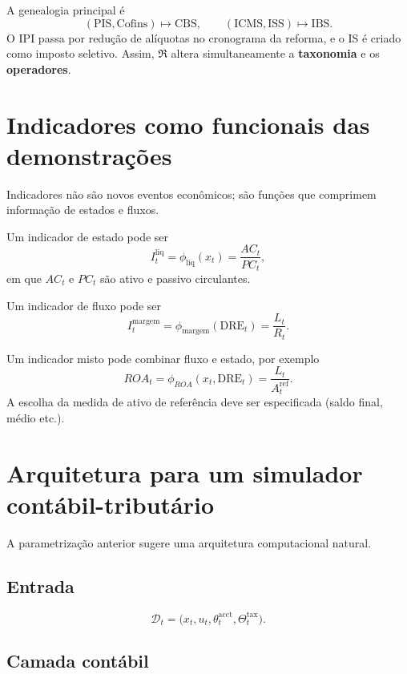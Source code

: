 \documentclass[11pt,a4paper]{article}
\newcommand{\DRE}{\mathrm{DRE}}
\newcommand{\CBS}{\mathrm{CBS}}
\newcommand{\IBS}{\mathrm{IBS}}
\newcommand{\ICMS}{\mathrm{ICMS}}
\newcommand{\ISS}{\mathrm{ISS}}
\newcommand{\PIS}{\mathrm{PIS}}
\newcommand{\COFINS}{\mathrm{Cofins}}
\begin{document}
A genealogia principal é
\[
(\PIS,\COFINS)\mapsto\CBS,
\qquad
(\ICMS,\ISS)\mapsto\IBS.
\]
O IPI passa por redução de alíquotas no cronograma da reforma, e o IS é criado como imposto seletivo. Assim, $\mathfrak R$ altera simultaneamente a \textbf{taxonomia} e os \textbf{operadores}.

\section{Indicadores como funcionais das demonstrações}

Indicadores não são novos eventos econômicos; são funções que comprimem informação de estados e fluxos.

Um indicador de estado pode ser
\[
I_t^{\mathrm{liq}}=\phi_{\mathrm{liq}}(x_t)
=\frac{AC_t}{PC_t},
\]
em que $AC_t$ e $PC_t$ são ativo e passivo circulantes.

Um indicador de fluxo pode ser
\[
I_t^{\mathrm{margem}}
=\phi_{\mathrm{margem}}(\DRE_t)
=\frac{L_t}{R_t}.
\]

Um indicador misto pode combinar fluxo e estado, por exemplo
\[
ROA_t=\phi_{ROA}(x_t,\DRE_t)
=\frac{L_t}{A_t^{\mathrm{ref}}}.
\]
A escolha da medida de ativo de referência deve ser especificada (saldo final, médio etc.).

\section{Arquitetura para um simulador contábil-tributário}

A parametrização anterior sugere uma arquitetura computacional natural.

\subsection{Entrada}

\begin{equation}
\boxed{
\mathcal D_t=
\bigl(x_t,u_t,\theta_t^{\mathrm{acct}},\Theta_t^{\mathrm{tax}}\bigr).
}
\end{equation}

\subsection{Camada contábil}
\end{document}
